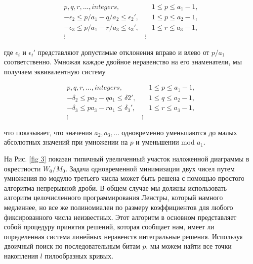 \documentclass[a4paper,12pt]{report}
\begin{document}
\begin{align*}
&p,q,r,\ldots,integers, & &1\leq p \leq a_1 - 1, \\
&-\epsilon_2 \leq p/a_1 - q/a_2 \leq \epsilon_2', & &1 \leq p \leq a_2 - 1, \\
&-\epsilon_3 \leq p/a_1 - r/a_3 \leq \epsilon_3', &  &1\leq r \leq a_3 - 1, \\
&\vdots &\vdots
\end{align*}

\noindent где $\epsilon_i$ и $\epsilon_i'$ представляют допустимые отклонения вправо и влево от $p/a_1$ соответственно. Умножая каждое двойное неравенство на его знаменатели, мы получаем эквивалентную систему

\begin{align*}
&p,q,r,\ldots,integers, & &1\leq p \leq a_1 - 1, \\
&-\delta_2 \leq pa_2 - qa_1 \leq \delta2', & &1 \leq q \leq a_2 - 1, \\
&-\delta_3 \leq pa_3 - ra_1 \leq \delta_3', &  &1\leq r \leq a_3 - 1, \\
&\vdots &\vdots
\end{align*}

\noindent что показывает, что значения $a_2, a_3, \ldots$ одновременно уменьшаются до малых абсолютных значений при умножении на $p$ и уменьшении mod $a_1$.

На Рис. \ref{fig 3} показан типичный увеличенный участок наложенной диаграммы в окрестности $W_0 / M_0$. Задача одновременной минимизации двух чисел путем умножения по модулю третьего числа может быть решена с помощью простого алгоритма непрерывной дроби. В общем случае мы должны использовать алгоритм целочисленного программирования Ленстры, который намного медленнее, но все же полиномиален по размеру коэффициентов для любого фиксированного числа неизвестных. Этот алгоритм в основном представляет собой процедуру принятия решений, которая сообщает нам, имеет ли определенная система линейных неравенств интегральные решения. Используя двоичный поиск по последовательным битам $p$, мы можем найти все точки накопления $l$ пилообразных кривых.
\end{document}
